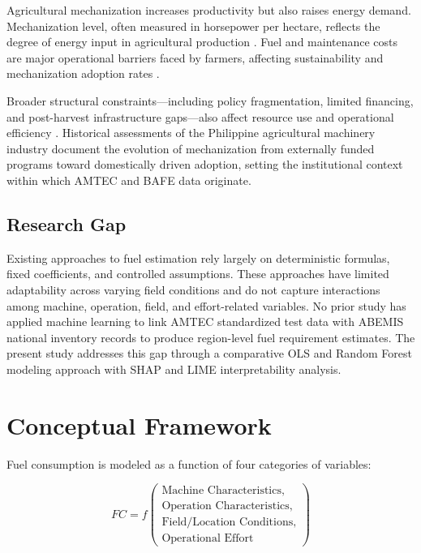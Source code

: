 \documentclass[conference]{IEEEtran}
\begin{document}
Agricultural mechanization increases productivity but also raises energy demand. Mechanization level, often measured in horsepower per hectare, reflects the degree of energy input in agricultural production \cite{bautista2024enhancing}. Fuel and maintenance costs are major operational barriers faced by farmers, affecting sustainability and mechanization adoption rates \cite{espino2024mechanization}.

Broader structural constraints---including policy fragmentation, limited financing, and post-harvest infrastructure gaps---also affect resource use and operational efficiency \cite{ichwandiani2025industry, briones2021philippine}. Historical assessments of the Philippine agricultural machinery industry \cite{itc2010machinery, jica1986philippines} document the evolution of mechanization from externally funded programs toward domestically driven adoption, setting the institutional context within which AMTEC and BAFE data originate.

\subsection{Research Gap}

Existing approaches to fuel estimation rely largely on deterministic formulas, fixed coefficients, and controlled assumptions. These approaches have limited adaptability across varying field conditions and do not capture interactions among machine, operation, field, and effort-related variables. No prior study has applied machine learning to link AMTEC standardized test data with ABEMIS national inventory records to produce region-level fuel requirement estimates. The present study addresses this gap through a comparative OLS and Random Forest modeling approach with SHAP and LIME interpretability analysis.

\section{Conceptual Framework}

Fuel consumption is modeled as a function of four categories of variables:

\[
FC = f\!\left(
\begin{array}{l}
\text{Machine Characteristics,}\\
\text{Operation Characteristics,}\\
\text{Field/Location Conditions,}\\
\text{Operational Effort}
\end{array}
\right)
\]
\end{document}
